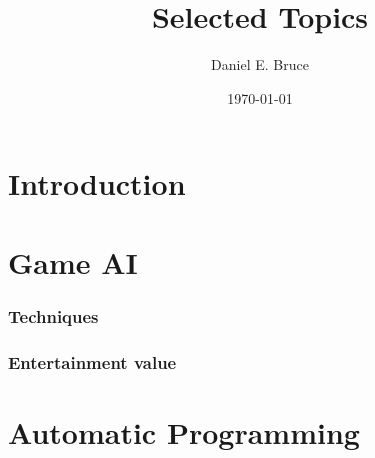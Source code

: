 \documentclass[]{report}
\begin{document}
\title{Selected Topics}
\author{Daniel E. Bruce}
\date{\today}
\maketitle

\tableofcontents

\chapter{Introduction}


\chapter{Game AI}
\label{cha:conclusion}

\subsection{Techniques}
\label{sec:techniques}

\subsection{Entertainment value}
\label{sec:entertainment-value}

\chapter{Automatic Programming}
\label{cha:autom-progr}


{}

\end{document}
